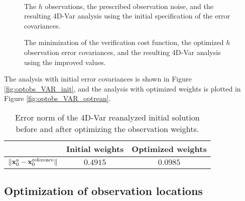\documentclass{article}
\newcommand{\x}{   \mathbf{x} }
\newcommand{\xa}{ \mathbf{x}^{\rm a} }
\begin{document}
\begin{figure}
\setcounter{subfigure}{0}
\centering
  \\
 \caption{The $h$ observations, the prescribed observation noise, and the resulting 4D-Var analysis using the initial specification of the error covariances.}
\end{figure}



\begin{figure}
\setcounter{subfigure}{0}
\centering
 \caption{The minimization of the verification cost function, the optimized $h$ observation error covariances, and the resulting 4D-Var analysis
 using the improved values.}
 \label{fig:optobs_OBSVAR}
\end{figure}



The analysis with initial error covariances is shown in Figure \ref{fig:optobs_VAR_init},
and the analysis with optimized weights is plotted in Figure \ref{fig:optobs_VAR_optrean}.



\begin{table}
\caption{Error norm of the 4D-Var reanalyzed initial solution before and after optimizing the observation weights.}
\centering
{
\begin{tabular}{|c||c|c|}
  \hline
  &  Initial weights & Optimized  weights \\
 \hline\hline
$\Vert \xa_0 - \x_0^{\rm reference} \Vert$ &  $0.4915$ & $0.0985$\\
 \hline
\end{tabular}
}
\label{Table:obsopt_gain2}
\end{table}

\subsection{Optimization of observation locations}
\end{document}
